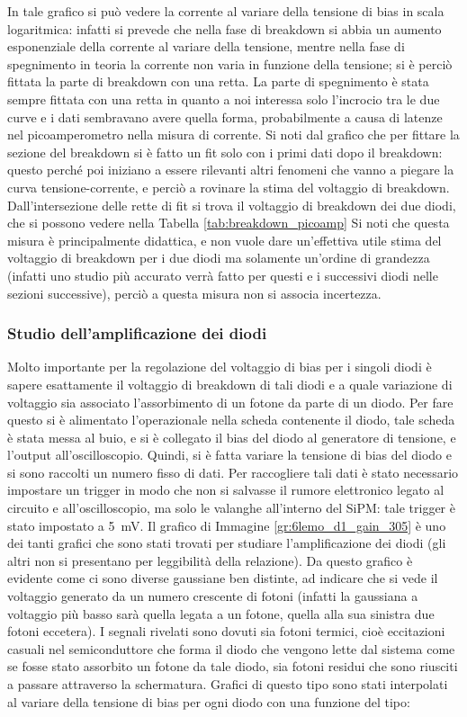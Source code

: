 In tale grafico si può vedere la corrente al variare della tensione di bias in scala logaritmica: infatti si prevede che nella fase  di breakdown si abbia un aumento esponenziale della corrente al variare della tensione, mentre nella fase di spegnimento in teoria la corrente non varia in funzione della tensione; si \`e perci\`o fittata la parte di breakdown con una retta. La parte di spegnimento \`e stata sempre fittata con una retta in quanto a noi interessa solo l'incrocio tra le due curve e i dati sembravano avere quella forma, probabilmente a causa di latenze nel picoamperometro nella misura di corrente. Si noti dal grafico che per fittare la sezione del breakdown si è fatto un fit solo con i primi dati dopo il breakdown: questo perché poi iniziano a essere rilevanti altri fenomeni che vanno a piegare la curva tensione-corrente, e perciò a rovinare la stima del voltaggio di breakdown.
Dall'intersezione delle rette di fit si trova il voltaggio di breakdown dei due diodi, che si possono vedere nella Tabella \ref{tab:breakdown_picoamp}
Si noti che questa misura è principalmente didattica, e non vuole dare un'effettiva utile stima del voltaggio di breakdown per i due diodi ma solamente un'ordine di grandezza
(infatti uno studio più accurato verrà fatto per questi e i successivi diodi nelle sezioni successive), perciò a questa misura non si associa incertezza.

\subsubsection{Studio dell'amplificazione dei diodi}
Molto importante per la regolazione del voltaggio di bias per i singoli diodi è sapere esattamente il voltaggio di breakdown di tali diodi e a quale variazione di
voltaggio sia associato l'assorbimento di un fotone da parte di un diodo. Per fare questo si è alimentato l'operazionale nella scheda contenente il diodo, tale
scheda è stata messa al buio, e si è collegato il bias del diodo al generatore di tensione, e l'output all'oscilloscopio. Quindi, si è fatta variare la tensione
di bias del diodo e si sono raccolti un numero fisso di dati. Per raccogliere tali dati è stato necessario impostare un trigger in modo che non si salvasse il rumore elettronico legato al circuito e all'oscilloscopio, ma solo le valanghe all'interno del SiPM: tale trigger è stato impostato a 5~mV.
Il grafico di Immagine \ref{gr:6lemo_d1_gain_305} è uno dei tanti grafici che sono stati
trovati per studiare l'amplificazione dei diodi (gli altri non si presentano per leggibilità della relazione). Da questo grafico è evidente come ci sono diverse gaussiane ben distinte, ad indicare che si vede il voltaggio
generato da un numero crescente di fotoni (infatti la gaussiana a voltaggio più basso sarà quella legata a un fotone, quella alla sua sinistra due fotoni eccetera).
I segnali rivelati sono dovuti sia fotoni termici, cioè eccitazioni casuali nel semiconduttore che forma il diodo che vengono lette dal sistema come se fosse stato assorbito un fotone
da tale diodo, sia fotoni residui che sono riusciti a passare attraverso la schermatura. Grafici di questo tipo sono stati interpolati al variare della tensione di bias per ogni diodo con una funzione del tipo:

